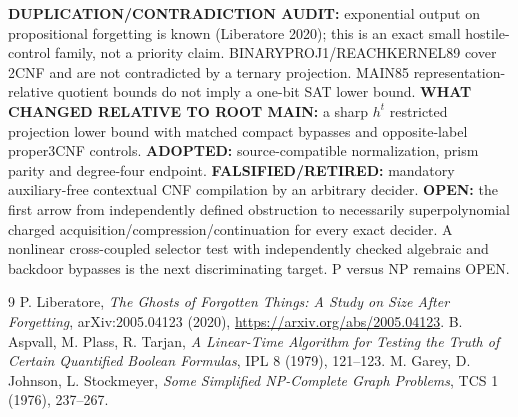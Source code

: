 \documentclass[11pt]{article}
\begin{document}
\textbf{DUPLICATION/CONTRADICTION AUDIT:} exponential output on propositional forgetting is known (Liberatore 2020); this is an exact small hostile-control family, not a priority claim. BINARYPROJ1/REACHKERNEL89 cover 2CNF and are not contradicted by a ternary projection. MAIN85 representation-relative quotient bounds do not imply a one-bit SAT lower bound. \textbf{WHAT CHANGED RELATIVE TO ROOT MAIN:} a sharp $h^t$ restricted projection lower bound with matched compact bypasses and opposite-label proper3CNF controls. \textbf{ADOPTED:} source-compatible normalization, prism parity and degree-four endpoint. \textbf{FALSIFIED/RETIRED:} mandatory auxiliary-free contextual CNF compilation by an arbitrary decider. \textbf{OPEN:} the first arrow from independently defined obstruction to necessarily superpolynomial charged acquisition/compression/continuation for every exact decider. A nonlinear cross-coupled selector test with independently checked algebraic and backdoor bypasses is the next discriminating target. P versus NP remains OPEN.

\begin{thebibliography}{9}
 P. Liberatore, \emph{The Ghosts of Forgotten Things: A Study on Size After Forgetting}, arXiv:2005.04123 (2020), \url{https://arxiv.org/abs/2005.04123}.
 B. Aspvall, M. Plass, R. Tarjan, \emph{A Linear-Time Algorithm for Testing the Truth of Certain Quantified Boolean Formulas}, IPL 8 (1979), 121--123.
 M. Garey, D. Johnson, L. Stockmeyer, \emph{Some Simplified NP-Complete Graph Problems}, TCS 1 (1976), 237--267.
\end{thebibliography}
\end{document}
